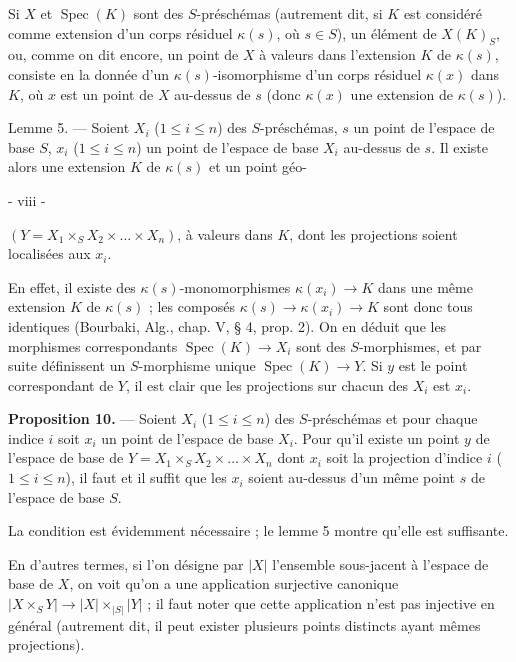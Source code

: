 Si $X$ et $\operatorname{Spec}(K)$ sont des $S$-préschémas (autrement dit, si $K$ est considéré comme extension d'un corps résiduel $\kappa(s)$, où $s \in S$), un élément de $X(K)_S$, ou, comme on dit encore, un point de $X$ à valeurs dans l'extension $K$ de $\kappa(s)$, consiste en la donnée d'un $\kappa(s)$-isomorphisme d'un corps résiduel $\kappa(x)$ dans $K$, où $x$ est un point de $X$ au-dessus de $s$ (donc $\kappa(x)$ une extension de $\kappa(s)$).

Lemme 5. — Soient $X_i$ ($1 \le i \le n$) des $S$-préschémas, $s$ un point de l'espace de base $S$, $x_i$ ($1 \le i \le n$) un point de l'espace de base $X_i$ au-dessus de $s$. Il existe alors une extension $K$ de $\kappa(s)$ et un point géo-

\newpage


- viii -

\noindent $(Y = X_1 \times_S X_2 \times \dots \times X_n)$, à valeurs dans $K$, dont les projections soient localisées aux $x_i$.

En effet, il existe des $\kappa(s)$-monomorphismes $\kappa(x_i) \to K$ dans une même extension $K$ de $\kappa(s)$ ; les composés $\kappa(s) \to \kappa(x_i) \to K$ sont donc tous identiques (Bourbaki, Alg., chap. V, § 4, prop. 2). On en déduit que les morphismes correspondants $\operatorname{Spec}(K) \to X_i$ sont des $S$-morphismes, et par suite définissent un $S$-morphisme unique $\operatorname{Spec}(K) \to Y$. Si $y$ est le point correspondant de $Y$, il est clair que les projections sur chacun des $X_i$ est $x_i$.

\noindent \textbf{Proposition 10.} — Soient $X_i$ ($1 \leq i \leq n$) des $S$-préschémas et pour chaque indice $i$ soit $x_i$ un point de l'espace de base $X_i$. Pour qu'il existe un point $y$ de l'espace de base de $Y = X_1 \times_S X_2 \times \dots \times X_n$ dont $x_i$ soit la projection d'indice $i$ ($1 \leq i \leq n$), il faut et il suffit que les $x_i$ soient au-dessus d'un même point $s$ de l'espace de base $S$.

La condition est évidemment nécessaire ; le lemme 5 montre qu'elle est suffisante.

En d'autres termes, si l'on désigne par $|X|$ l'ensemble sous-jacent à l'espace de base de $X$, on voit qu'on a une application surjective canonique $|X \times_S Y| \to |X| \times_{|S|} |Y|$ ; il faut noter que cette application n'est pas injective en général (autrement dit, il peut exister plusieurs points distincts ayant mêmes projections).

